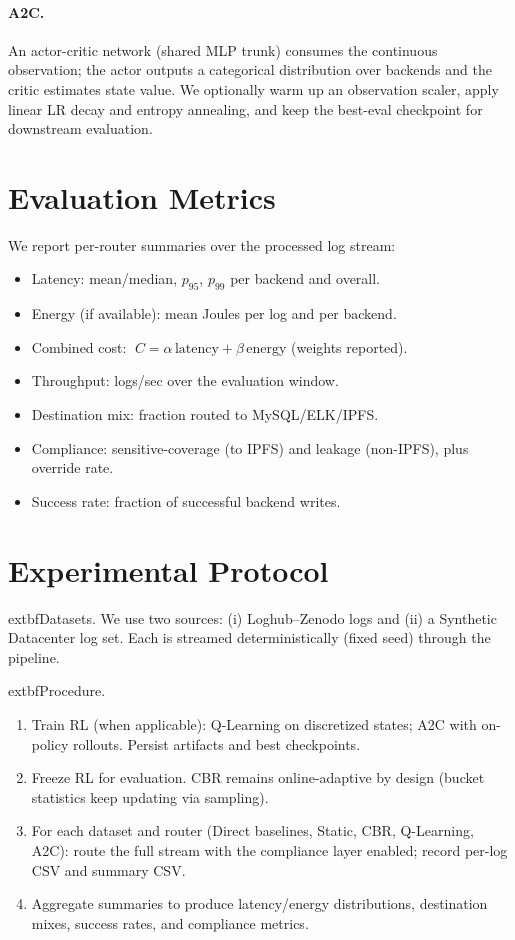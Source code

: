 \paragraph{A2C.} An actor-critic network (shared MLP trunk) consumes the continuous observation; the actor outputs a categorical distribution over backends and the critic estimates state value. We optionally warm up an observation scaler, apply linear LR decay and entropy annealing, and keep the best-eval checkpoint for downstream evaluation.

\section{Evaluation Metrics}\label{s:metrics}
We report per-router summaries over the processed log stream:
\begin{itemize}
  \item Latency: mean/median, $p_{95}$, $p_{99}$ per backend and overall.
  \item Energy (if available): mean Joules per log and per backend.
  \item Combined cost: $\;C=\alpha\,\text{latency}+\beta\,\text{energy}$ (weights reported).
  \item Throughput: logs/sec over the evaluation window.
  \item Destination mix: fraction routed to MySQL/ELK/IPFS.
  \item Compliance: sensitive-coverage (to IPFS) and leakage (non-IPFS), plus override rate.
  \item Success rate: fraction of successful backend writes.
\end{itemize}

\section{Experimental Protocol}\label{s:protocol}
	extbf{Datasets.} We use two sources: (i) Loghub–Zenodo logs and (ii) a Synthetic Datacenter log set. Each is streamed deterministically (fixed seed) through the pipeline.

	extbf{Procedure.}
\begin{enumerate}
  \item Train RL (when applicable): Q-Learning on discretized states; A2C with on-policy rollouts. Persist artifacts and best checkpoints.
  \item Freeze RL for evaluation. CBR remains online-adaptive by design (bucket statistics keep updating via sampling).
  \item For each dataset and router (Direct baselines, Static, CBR, Q-Learning, A2C): route the full stream with the compliance layer enabled; record per-log CSV and summary CSV.
  \item Aggregate summaries to produce latency/energy distributions, destination mixes, success rates, and compliance metrics.
\end{enumerate}

